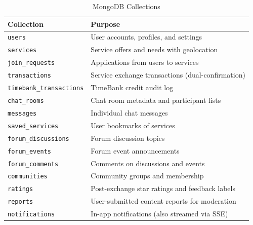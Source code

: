 \documentclass[11pt,a4paper]{report}
\begin{document}
\begin{table}[h]
    \centering
    \begin{tabularx}{\textwidth}{|l|X|}
        \hline
        \textbf{Collection}             & \textbf{Purpose}                                  \\
        \hline
        \texttt{users}                  & User accounts, profiles, and settings             \\
        \hline
        \texttt{services}               & Service offers and needs with geolocation         \\
        \hline
        \texttt{join\_requests}         & Applications from users to services               \\
        \hline
        \texttt{transactions}           & Service exchange transactions (dual-confirmation) \\
        \hline
        \texttt{timebank\_transactions} & TimeBank credit audit log                         \\
        \hline
        \texttt{chat\_rooms}            & Chat room metadata and participant lists          \\
        \hline
        \texttt{messages}               & Individual chat messages                          \\
        \hline
        \texttt{saved\_services}        & User bookmarks of services                        \\
        \hline
        \texttt{forum\_discussions}     & Forum discussion topics                           \\
        \hline
        \texttt{forum\_events}          & Forum event announcements                         \\
        \hline
        \texttt{forum\_comments}        & Comments on discussions and events                \\
        \hline
        \texttt{communities}            & Community groups and membership                   \\
        \hline
        \texttt{ratings}                & Post-exchange star ratings and feedback labels    \\
        \hline
        \texttt{reports}                & User-submitted content reports for moderation     \\
        \hline
        \texttt{notifications}          & In-app notifications (also streamed via SSE)      \\
        \hline
    \end{tabularx}
    \caption{MongoDB Collections}
\end{table}
\end{document}
